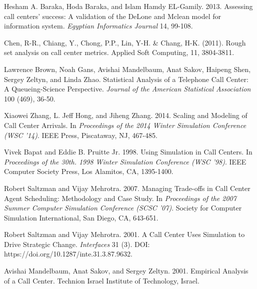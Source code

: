 \documentclass[12pt]{article}
\begin{document}
\newpage
\clearpage
{}
\begin{thebibliography}{12}
	


Hesham A. Baraka, Hoda Baraka, and Islam Hamdy EL-Gamily. 2013. Assessing call centers’ success: A validation of the DeLone and Mclean model for information system. \textit{Egyptian Informatics Journal} 14, 99-108.

Chen, R-R., Chiang, Y., Chong, P.P., Lin, Y-H. \& Chang, H-K. (2011). Rough set analysis on call center metrics. Applied Soft Computing, 11, 3804-3811.

Lawrence Brown, Noah Gans, Avishai Mandelbaum, Anat Sakov, Haipeng Shen, Sergey Zeltyn, and Linda Zhao. Statistical Analysis of a Telephone Call Center: A Queueing-Science Perspective. \textit{Journal of the American Statistical Association} 100 (469), 36-50.

Xiaowei Zhang, L. Jeff Hong, and Jiheng Zhang. 2014. Scaling and Modeling of Call Center Arrivals. In \textit{Proceedings of the 2014 Winter Simulation Conference (WSC ’14)}. IEEE Press, Piscataway, NJ, 467-485. 

Vivek Bapat and Eddie B. Pruitte Jr. 1998. Using Simulation in Call Centers. In \textit{Proceedings of the 30th.  1998 Winter Simulation Conference (WSC ’98)}. IEEE Computer Society Press, Los Alamitos, CA, 1395-1400.

Robert Saltzman and Vijay Mehrotra. 2007. Managing Trade-offs in Call Center Agent Scheduling: Methodology and Case Study. In \textit{Proceedings of the 2007 Summer Computer Simulation Conference (SCSC ’07)}. Society for Computer Simulation International, San Diego, CA, 643-651.


Robert Saltzman and Vijay Mehrotra. 2001. A Call Center Uses Simulation to Drive Strategic Change. \textit{Interfaces} 31 (3). DOI: https://doi.org/10.1287/inte.31.3.87.9632.

Avishai Mandelbaum, Anat Sakov, and Sergey Zeltyn. 2001. Empirical Analysis of a Call Center. Technion Israel Institute of Technology, Israel.

\end{thebibliography}
\end{document}
